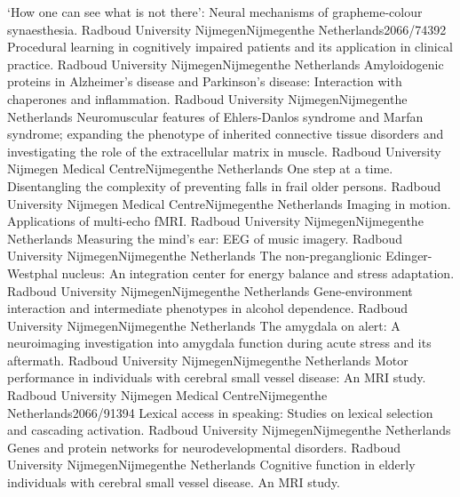 	{‘How one can see what is not there’: Neural mechanisms of grapheme-colour synaesthesia.}
	{Radboud University Nijmegen}{Nijmegen}{the Netherlands}{2066/74392}
	{Procedural learning in cognitively impaired patients and its application in clinical practice.}
	{Radboud University Nijmegen}{Nijmegen}{the Netherlands}{}
	{Amyloidogenic proteins in Alzheimer’s disease and Parkinson’s disease: Interaction with chaperones and inflammation.}
	{Radboud University Nijmegen}{Nijmegen}{the Netherlands}{}
	{Neuromuscular features of Ehlers-Danlos syndrome and Marfan syndrome; expanding the phenotype of inherited connective tissue disorders and investigating the role of the extracellular matrix in muscle.}
	{Radboud University Nijmegen Medical Centre}{Nijmegen}{the Netherlands}{}
	{One step at a time. Disentangling the complexity of preventing falls in frail older persons.}
	{Radboud University Nijmegen Medical Centre}{Nijmegen}{the Netherlands}{}
	{Imaging in motion. Applications of multi-echo fMRI.}
	{Radboud University Nijmegen}{Nijmegen}{the Netherlands}{}
	{Measuring the mind’s ear: EEG of music imagery.}
	{Radboud University Nijmegen}{Nijmegen}{the Netherlands}{}
	{The non-preganglionic Edinger-Westphal nucleus: An integration center for energy balance and stress adaptation.}
	{Radboud University Nijmegen}{Nijmegen}{the Netherlands}{}
	{Gene-environment interaction and intermediate phenotypes in alcohol dependence.}
	{Radboud University Nijmegen}{Nijmegen}{the Netherlands}{}
	{The amygdala on alert: A neuroimaging investigation into amygdala function during acute stress and its aftermath.}
	{Radboud University Nijmegen}{Nijmegen}{the Netherlands}{}
	{Motor performance in individuals with cerebral small vessel disease: An MRI study.}
	{Radboud University Nijmegen Medical Centre}{Nijmegen}{the Netherlands}{2066/91394}
	{Lexical access in speaking: Studies on lexical selection and cascading activation.}
	{Radboud University Nijmegen}{Nijmegen}{the Netherlands}{}
	{Genes and protein networks for neurodevelopmental disorders.}
	{Radboud University Nijmegen}{Nijmegen}{the Netherlands}{}
	{Cognitive function in elderly individuals with cerebral small vessel disease. An MRI study.}
